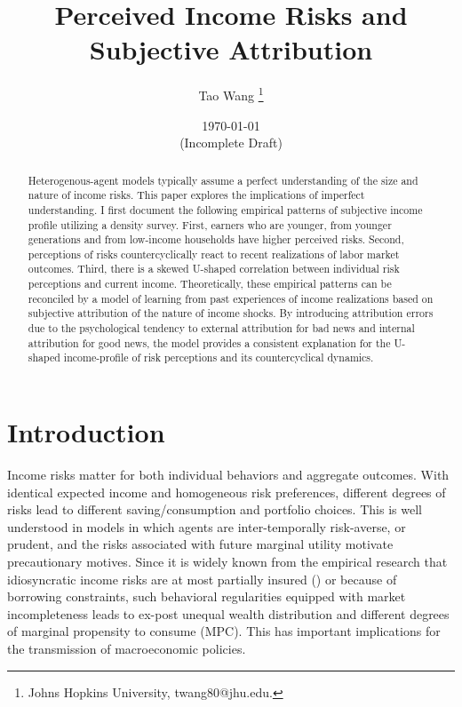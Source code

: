 \documentclass[12pt,notitlepage,onecolumn,aps,pra]{article}
\begin{document}
    
    \title{Perceived Income Risks and Subjective Attribution}\author{Tao Wang \thanks{Johns Hopkins University, twang80@jhu.edu.}}

\date{\today \\(Incomplete Draft)}
\maketitle\begin{abstract}Heterogenous-agent models typically assume a perfect understanding of the size and nature of income risks. This paper explores the implications of imperfect understanding. I first document the following empirical patterns of subjective income profile utilizing a density survey. First, earners who are younger, from younger generations and from low-income households have higher perceived risks. Second, perceptions of risks countercyclically react to recent realizations of labor market outcomes. Third, there is a skewed U-shaped correlation between individual risk perceptions and current income. Theoretically, these empirical patterns can be reconciled by a model of learning from past experiences of income realizations based on subjective attribution of the nature of income shocks. By introducing attribution errors due to the psychological tendency to external attribution for bad news and internal attribution for good news, the model provides a consistent explanation for the U-shaped income-profile of risk perceptions and its countercyclical dynamics.\end{abstract}


    
    

    
    \hypertarget{introduction}{%
\section{Introduction}\label{introduction}}

Income risks matter for both individual behaviors and aggregate
outcomes. With identical expected income and homogeneous risk
preferences, different degrees of risks lead to different
saving/consumption and portfolio choices. This is well understood in
models in which agents are inter-temporally risk-averse, or prudent, and
the risks associated with future marginal utility motivate precautionary
motives. Since it is widely known from the empirical research that
idiosyncratic income risks are at most partially insured
(\cite{blundell_consumption_2008}) or because of borrowing constraints,
such behavioral regularities equipped with market incompleteness leads
to ex-post unequal wealth distribution and different degrees of marginal
propensity to consume (MPC). This has important implications for the
transmission of macroeconomic policies.
\end{document}

